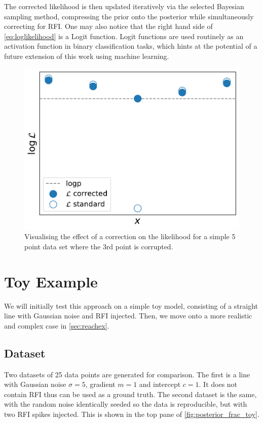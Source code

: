 \documentclass[fleqn,usenatbib]{mnras}
\begin{document}
The corrected likelihood is then updated iteratively via the selected Bayesian sampling method, compressing the prior onto the posterior while simultaneously correcting for RFI. One may also notice that the right hand side of \cref{eq:loglikelihood} is a Logit function. Logit functions are used routinely as an activation function in binary classification tasks, which hints at the potential of a future extension of this work using machine learning.

\begin{figure}
	\includegraphics[width=\columnwidth]{f_theory_sketch.pdf}
    \caption{Visualising the effect of a correction on the likelihood for a simple 5 point data set where the 3rd point is corrupted.}
    \label{fig:theorysketch}
\end{figure}
\section{Toy Example}\label{sec:toyex}
We will initially test this approach on a simple toy model, consisting of a straight line with Gaussian noise and RFI injected. Then, we move onto a more realistic and complex case in \cref{sec:reachex}.
\subsection{Dataset}\label{sec:toyexdataset}
Two datasets of 25 data points are generated for comparison. The first is a line with Gaussian noise $\sigma=5$, gradient $m=1$ and intercept $c=1$. It does not contain RFI thus can be used as a ground truth. The second dataset is the same, with the random noise identically seeded so the data is reproducible, but with two RFI spikes injected. This is shown in the top pane of \cref{fig:posterior_frac_toy}.
\end{document}
